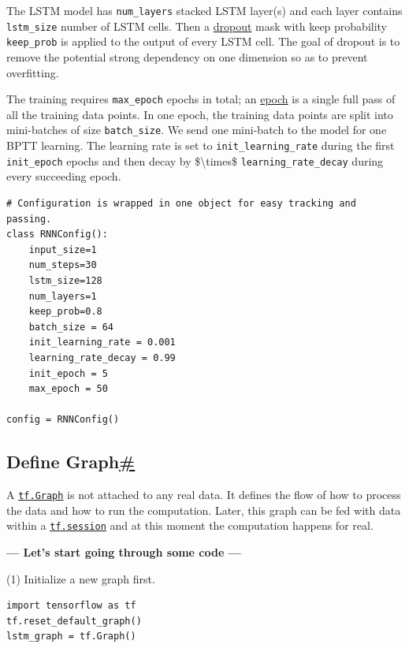The LSTM model has \texttt{num\_layers} stacked LSTM layer(s) and each layer contains \texttt{lstm\_size} number of LSTM cells. Then a \href{https://www.cs.toronto.edu/~hinton/absps/JMLRdropout.pdf}{dropout} mask with keep probability \texttt{keep\_prob} is applied to the output of every LSTM cell. The goal of dropout is to remove the potential strong dependency on one dimension so as to prevent overfitting.

The training requires \texttt{max\_epoch} epochs in total; an \href{http://www.fon.hum.uva.nl/praat/manual/epoch.html}{epoch} is a single full pass of all the training data points. In one epoch, the training data points are split into mini-batches of size \texttt{batch\_size}. We send one mini-batch to the model for one BPTT learning. The learning rate is set to \texttt{init\_learning\_rate} during the first \texttt{init\_epoch} epochs and then decay by \$\textbackslash times\$ \texttt{learning\_rate\_decay} during every succeeding epoch.

\begin{verbatim}
# Configuration is wrapped in one object for easy tracking and passing.
class RNNConfig():
    input_size=1
    num_steps=30
    lstm_size=128
    num_layers=1
    keep_prob=0.8
    batch_size = 64
    init_learning_rate = 0.001
    learning_rate_decay = 0.99
    init_epoch = 5
    max_epoch = 50

config = RNNConfig()
\end{verbatim}

\subsection{\texorpdfstring{Define Graph\hyperref[define-graph]{\#}}{Define Graph\#}}\label{define-graph}

A \href{https://www.tensorflow.org/api_docs/python/tf/Graph}{\texttt{tf.Graph}} is not attached to any real data. It defines the flow of how to process the data and how to run the computation. Later, this graph can be fed with data within a \href{https://www.tensorflow.org/api_docs/python/tf/Session}{\texttt{tf.session}} and at this moment the computation happens for real.

\textbf{--- Let's start going through some code ---}

(1) Initialize a new graph first.

\begin{verbatim}
import tensorflow as tf
tf.reset_default_graph()
lstm_graph = tf.Graph()
\end{verbatim}

